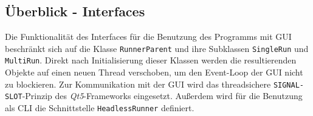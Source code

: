 \subsection{Überblick - Interfaces}
\label{subsec:aufbau_frontend_ueberblick_interfaces}
Die Funktionalität des Interfaces für die Benutzung des Programms mit \ac{GUI} beschränkt sich auf die Klasse \texttt{RunnerParent}
und ihre Subklassen \texttt{SingleRun} und \texttt{MultiRun}.
Direkt nach Initialisierung dieser Klassen werden die resultierenden Objekte auf einen neuen Thread verschoben, um den Event-Loop der \ac{GUI} nicht zu blockieren.
Zur Kommunikation mit der \ac{GUI} wird das threadsichere \texttt{SIGNAL-SLOT}-Prinzip \cite{Qt52024} des \textit{Qt5}-Frameworks eingesetzt.
Außerdem wird für die Benutzung als \ac{CLI} die Schnittstelle \texttt{HeadlessRunner} definiert.
